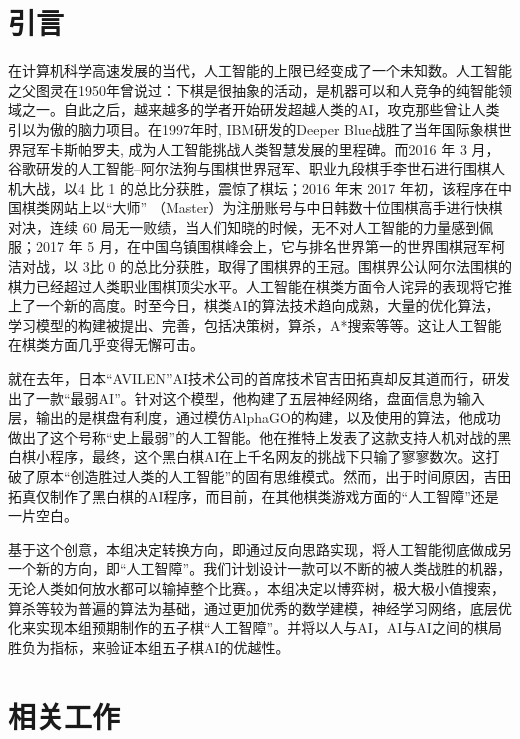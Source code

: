 \documentclass[a4paper]{article}
\begin{document}
    \begin{multicols}{2}
    \section{引言}
    在计算机科学高速发展的当代，人工智能的上限已经变成了一个未知数。人工智能之父图灵在1950年曾说过：下棋是很抽象的活动，是机器可以和人竞争的纯智能领域之一。\cite{ref1}自此之后，越来越多的学者开始研发超越人类的AI，攻克那些曾让人类引以为傲的脑力项目。在1997年时, IBM研发的Deeper Blue战胜了当年国际象棋世界冠军卡斯帕罗夫, 成为人工智能挑战人类智慧发展的里程碑。\cite{b1}而2016 年 3 月，谷歌研发的人工智能–阿尔法狗与围棋世界冠军、职业九段棋手李世石进行围棋人机大战，以4 比 1 的总比分获胜，震惊了棋坛；2016 年末 2017 年初，该程序在中国棋类网站上以“大师” （Master）为注册账号与中日韩数十位围棋高手进行快棋对决，连续 60 局无一败绩，当人们知晓的时候，无不对人工智能的力量感到佩服；2017 年 5 月，在中国乌镇围棋峰会上，它与排名世界第一的世界围棋冠军柯洁对战，以 3比 0 的总比分获胜，取得了围棋界的王冠。围棋界公认阿尔法围棋的棋力已经超过人类职业围棋顶尖水平。\cite{b3}人工智能在棋类方面令人诧异的表现将它推上了一个新的高度。时至今日，棋类AI的算法技术趋向成熟，大量的优化算法，学习模型的构建被提出、完善，包括决策树，算杀，A*搜索等等。这让人工智能在棋类方面几乎变得无懈可击。\cite{b2} \par
就在去年，日本“AVILEN”AI技术公司的首席技术官吉田拓真却反其道而行，研发出了一款“最弱AI”。针对这个模型，他构建了五层神经网络，盘面信息为输入层，输出的是棋盘有利度，通过模仿AlphaGO的构建，以及使用的算法，他成功做出了这个号称“史上最弱”的人工智能。他在推特上发表了这款支持人机对战的黑白棋小程序，最终，这个黑白棋AI在上千名网友的挑战下只输了寥寥数次。这打破了原本“创造胜过人类的人工智能”的固有思维模式。然而，出于时间原因，吉田拓真仅制作了黑白棋的AI程序\cite{ref2}，而目前，在其他棋类游戏方面的“人工智障”还是一片空白。\par
基于这个创意，本组决定转换方向，即通过反向思路实现，将人工智能彻底做成另一个新的方向，即“人工智障”。我们计划设计一款可以不断的被人类战胜的机器，无论人类如何放水都可以输掉整个比赛。，本组决定以博弈树，极大极小值搜索，算杀等较为普遍的算法为基础，通过更加优秀的数学建模，神经学习网络，底层优化来实现本组预期制作的五子棋“人工智障”。并将以人与AI，AI与AI之间的棋局胜负为指标，来验证本组五子棋AI的优越性。
    \section{相关工作}

\end{multicols}
\end{document}
